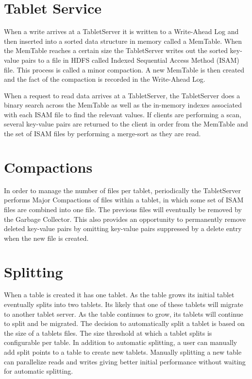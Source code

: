 \section{Tablet Service}


When a write arrives at a TabletServer it is written to a Write-Ahead Log and
then inserted into a sorted data structure in memory called a MemTable. When the
MemTable reaches a certain size the TabletServer writes out the sorted key-value
pairs to a file in HDFS called Indexed Sequential Access Method (ISAM)
file. This process is called a minor compaction. A new MemTable is then created
and the fact of the compaction is recorded in the Write-Ahead Log.

When a request to read data arrives at a TabletServer, the TabletServer does a
binary search across the MemTable as well as the in-memory indexes associated
with each ISAM file to find the relevant values. If clients are performing a
scan, several key-value pairs are returned to the client in order from the
MemTable and the set of ISAM files by performing a merge-sort as they are read.

\section{Compactions}

In order to manage the number of files per tablet, periodically the TabletServer
performs Major Compactions of files within a tablet, in which some set of ISAM
files are combined into one file. The previous files will eventually be removed
by the Garbage Collector. This also provides an opportunity to permanently
remove deleted key-value pairs by omitting key-value pairs suppressed by a
delete entry when the new file is created.

\section{Splitting}

When a table is created it has one tablet. As the table grows its initial
tablet eventually splits into two tablets. Its likely that one of these
tablets will migrate to another tablet server. As the table continues to grow,
its tablets will continue to split and be migrated. The decision to
automatically split a tablet is based on the size of a tablets files. The
size threshold at which a tablet splits is configurable per table. In addition
to automatic splitting, a user can manually add split points to a table to
create new tablets. Manually splitting a new table can parallelize reads and
writes giving better initial performance without waiting for automatic
splitting.


